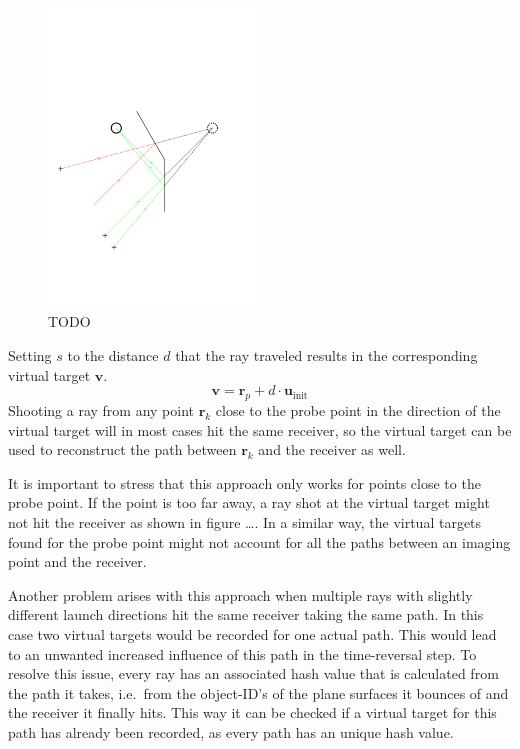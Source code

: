 \begin{figure}[ht]
    \centering
    \includegraphics[width=0.5\textwidth]{figures/VirtualTargets.pdf}
    \caption{TODO}\label{fig:virtual_targets}
\end{figure}

Setting \(s\) to the distance \(d\) that the ray traveled results in the corresponding virtual target \(\bm{v}\).
\begin{equation}\label{eq:visual_target}
    \bm{v} = \bm{r}_p + d \cdot \bm{u}_{\text{init}}
\end{equation}
Shooting a ray from any point \(\bm{r}_k\) close to the probe point in the direction of the virtual target will in most cases hit the same receiver, so the virtual target can be used to reconstruct the path between \(\bm{r}_k\) and the receiver as well.

It is important to stress that this approach only works for points close to the probe point.
If the point is too far away, a ray shot at the virtual target might not hit the receiver as shown in figure \ldots.
In a similar way, the virtual targets found for the probe point might not account for all the paths between an imaging point and the receiver.

Another problem arises with this approach when multiple rays with slightly different launch directions hit the same receiver taking the same path.
In this case two virtual targets would be recorded for one actual path.
This would lead to an unwanted increased influence of this path in the time-reversal step.
To resolve this issue, every ray has an associated hash value that is calculated from the path it takes, i.e.~from the object-ID's of the plane surfaces it bounces of and the receiver it finally hits.
This way it can be checked if a virtual target for this path has already been recorded, as every path has an unique hash value.


